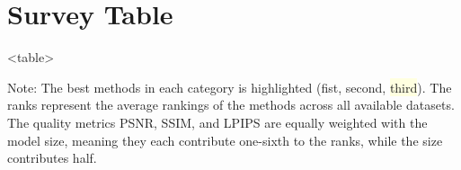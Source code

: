 \section*{Survey Table}
{
\footnotesize
\setlength{\tabcolsep}{3pt}

\begin{adjustbox}{center}
<table>
\end{adjustbox}
\newline\newline
\noindent Note: The best methods in each category is highlighted (\colorbox{lightred}{fist}, \colorbox{lightorange}{second}, \colorbox{lightyellow}{third}). The ranks represent the average rankings of the methods across all available datasets. The quality metrics PSNR, SSIM, and LPIPS are equally weighted with the model size, meaning they each contribute one-sixth to the ranks, while the size contributes half.
}